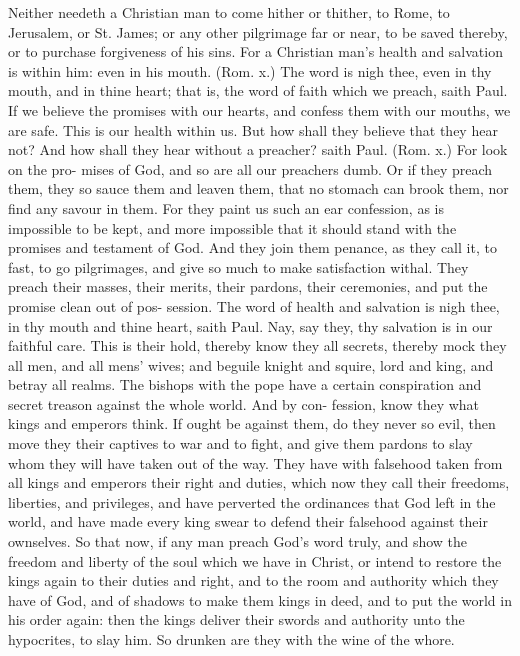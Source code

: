 \documentclass{custom}
\begin{document}
Neither needeth a Christian man to come hither or 
thither, to Rome, to Jerusalem, or St. James; or any 
other pilgrimage far or near, to be saved thereby, or to 
purchase forgiveness of his sins. For a Christian man's 
health and salvation is within him: even in his mouth. 
(Rom. x.) The word is nigh thee, even in thy mouth, 
and in thine heart; that is, the word of faith which we 
preach, saith Paul. If we believe the promises with our 
hearts, and confess them with our mouths, we are safe. 
This is our health within us. But how shall they believe 
that they hear not? And how shall they hear without a 
preacher? saith Paul. (Rom. x.) For look on the pro- 
mises of God, and so are all our preachers dumb. Or 
if they preach them, they so sauce them and leaven them, 
that no stomach can brook them, nor find any savour in 
them. For they paint us such an ear confession, as is 
impossible to be kept, and more impossible that it should 
stand with the promises and testament of God. And 
they join them penance, as they call it, to fast, to go 
pilgrimages, and give so much to make satisfaction withal. 
They preach their masses, their merits, their pardons, 
their ceremonies, and put the promise clean out of pos- 
session. The word of health and salvation is nigh thee, 
in thy mouth and thine heart, saith Paul. Nay, say they, 
thy salvation is in our faithful care. This is their 
hold, thereby know they all secrets, thereby mock 
they all men, and all mens' wives; and beguile knight 
and squire, lord and king, and betray all realms. The 
bishops with the pope have a certain conspiration and 
secret treason against the whole world. And by con- 
fession, know they what kings and emperors think. If 
ought be against them, do they never so evil, then move 
they their captives to war and to fight, and give them 
pardons to slay whom they will have taken out of the way. 
They have with falsehood taken from all kings and emperors 
their right and duties, which now they call their freedoms, 
liberties, and privileges, and have perverted the ordinances 
that God left in the world, and have made every king swear 
to defend their falsehood against their ownselves. So that 
now, if any man preach God's word truly, and show 
the freedom and liberty of the soul which we have 
in Christ, or intend to restore the kings again to their 
duties and right, and to the room and authority which 
they have of God, and of shadows to make them kings 
in deed, and to put the world in his order again: then the 
kings deliver their swords and authority unto the hypocrites, 
to slay him. So drunken are they with the wine of 
the whore. 
\end{document}
